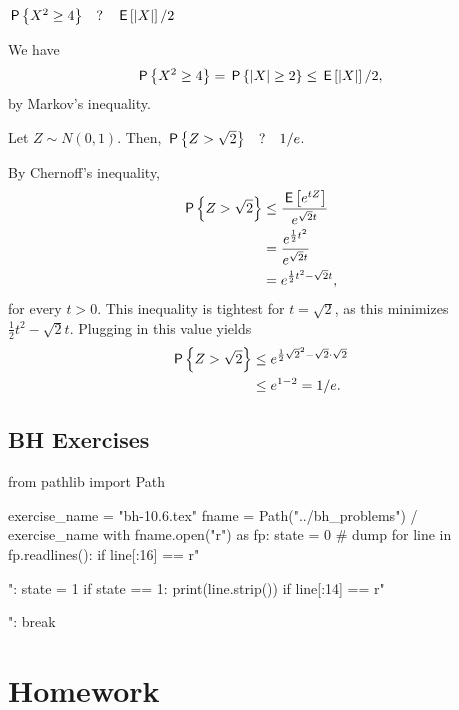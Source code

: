\begin{exercise}
$\P{X^2 \geq 4} \quad?\quad \E{|X|}/2$
\begin{solution}
We have
\begin{align}
    \P{X^2 \geq 4} = \P{|X| \geq 2} \leq \E{|X|}/2,
\end{align}
by Markov's inequality.
\end{solution}
\end{exercise}



\begin{exercise}
Let $Z \sim N(0,1)$. Then, $\P{Z > \sqrt{2}} \quad?\quad 1/e$.
\begin{solution}
By Chernoff's inequality,
\begin{align}
    \P{Z > \sqrt{2}} &\leq \frac{\E{e^{tZ}}}{e^{\sqrt{2}t}} \\
    &= \frac{e^{\frac{1}{2}t^2}}{e^{\sqrt{2}t}} \\
    &= e^{\frac{1}{2}t^2 - \sqrt{2}t},
\end{align}
for every $t > 0$. This inequality is tightest for $t = \sqrt{2}$, as this minimizes $\frac{1}{2}t^2 - \sqrt{2}t$. Plugging in this value yields
\begin{align}
    \P{Z > \sqrt{2}} &\leq e^{\frac{1}{2}\sqrt{2}^2 - \sqrt{2}\cdot \sqrt{2}}\\
    &\leq e^{1 - 2} = 1/e.
\end{align}
\end{solution}
\end{exercise}


\subsection{BH Exercises}

\begin{pycode}
from pathlib import Path

exercise_name = "bh-10.6.tex"
fname = Path("../bh_problems") / exercise_name
with fname.open("r") as fp:
    state = 0  # dump
    for line in fp.readlines():
        if line[:16] == r"\begin{exercise}":
            state = 1
        if state == 1:
            print(line.strip())
        if line[:14] == r"\end{exercise}":
            break
\end{pycode}


\section{Homework}
\label{sec:homework}

